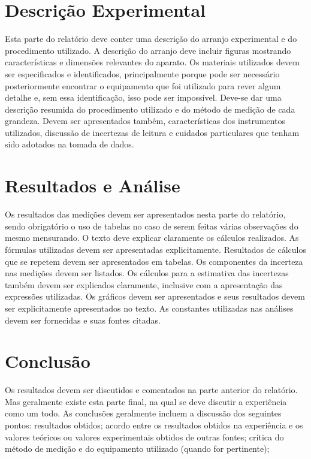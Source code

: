 \documentclass[a4paper]{article}
\begin{document}
\section{Descrição Experimental}
Esta parte do relatório deve conter uma descrição do arranjo experimental e do procedimento utilizado. A descrição do arranjo deve incluir figuras mostrando características e dimensões relevantes do aparato. Os materiais utilizados devem ser especificados e identificados, principalmente porque pode ser necessário posteriormente encontrar o equipamento que foi utilizado para rever algum detalhe e, sem essa identificação, isso pode ser impossível. Deve-se dar uma descrição resumida do procedimento utilizado e do método de medição de cada grandeza. Devem  ser apresentados também, características dos instrumentos utilizados, discussão de incertezas de leitura e cuidados particulares que tenham sido adotados na tomada de dados.

\section{Resultados e Análise}
Os resultados das medições devem ser apresentados nesta parte do relatório, sendo
obrigatório o uso de tabelas no caso de serem feitas várias observações do mesmo
mensurando.
O texto deve explicar claramente os cálculos realizados. As fórmulas utilizadas
devem ser apresentadas explicitamente. Resultados de cálculos que se repetem devem ser
apresentados em tabelas.
Os componentes da incerteza nas medições devem ser listados. Os cálculos para
a estimativa das incertezas também devem ser explicados claramente, inclusive com a
apresentação das expressões utilizadas.
Os gráficos devem ser apresentados e seus resultados devem ser explicitamente
apresentados no texto.
As constantes utilizadas nas análises devem ser fornecidas e suas fontes citadas.

\section{Conclusão}
Os resultados devem ser discutidos e comentados na parte anterior do relatório.
Mas geralmente existe esta parte final, na qual se deve discutir a experiência como um
todo. As conclusões geralmente incluem a discussão dos seguintes pontos: resultados
obtidos; acordo entre os resultados obtidos na experiência e os valores teóricos ou valores
experimentais obtidos de outras fontes; crítica do método de medição e do equipamento
utilizado (quando for pertinente);
\end{document}
